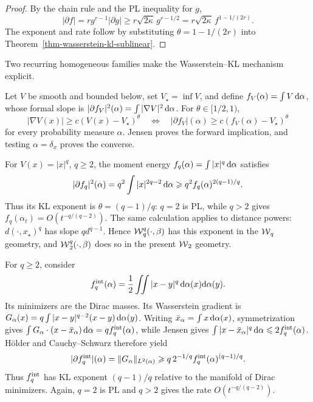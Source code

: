\begin{proof}
	By the chain rule and the PL inequality for \(g\),
	\[
		|\partial f|
		=
		rg^{r-1}|\partial g|
		\geq
		r\sqrt{2\kappa}\,g^{r-1/2}
		=
		r\sqrt{2\kappa}\,f^{1-1/(2r)}.
	\]
	The exponent and rate follow by substituting \(\theta=1-1/(2r)\) into Theorem~\ref{thm-wasserstein-kl-sublinear}.
\end{proof}

Two recurring homogeneous families make the Wasserstein--KL mechanism explicit.

\begin{rem}\label{ex-homogeneous-wasserstein-kl}
	Let \(V\) be smooth and bounded below, set \(V_\star=\inf V\), and define \(f_V(\alpha)=\int V\,\d\alpha\), whose formal slope is \(|\partial f_V|^2(\alpha)=\int|\nabla V|^2\,\d\alpha\). For \(\theta\in[1/2,1)\),
	\[
		|\nabla V(x)|\geq c(V(x)-V_\star)^\theta
		\quad\Longleftrightarrow\quad
		|\partial f_V|(\alpha)\geq c(f_V(\alpha)-V_\star)^\theta
	\]
	for every probability measure \(\alpha\). Jensen proves the forward implication, and testing \(\alpha=\delta_x\) proves the converse.

	For \(V(x)=|x|^q\), \(q\geq2\), the moment energy \(f_q(\alpha)=\int|x|^q\,\d\alpha\) satisfies
	\[
		|\partial f_q|^2(\alpha)
		=q^2\int|x|^{2q-2}\,\d\alpha
		\geq q^2 f_q(\alpha)^{2(q-1)/q}.
	\]
	Thus its KL exponent is \(\theta=(q-1)/q\): \(q=2\) is PL, while \(q>2\) gives \(f_q(\alpha_t)=O(t^{-q/(q-2)})\). The same calculation applies to distance powers: \(d(\cdot,x_\star)^q\) has slope \(q d^{q-1}\). Hence \(\Wass_q^q(\cdot,\beta)\) has this exponent in the \(\Wass_q\) geometry, and \(\Wass_2^q(\cdot,\beta)\) does so in the present \(\Wass_2\) geometry.
\end{rem}

\begin{rem}\label{rem-homogeneous-interaction-kl}
	For \(q\geq2\), consider
	\[
		f_q^{\rm int}(\alpha)
		=
		\frac12\iint |x-y|^q\,\d\alpha(x)\d\alpha(y).
	\]
	Its minimizers are the Dirac masses. Its Wasserstein gradient is \(G_\alpha(x)=q\int|x-y|^{q-2}(x-y)\,\d\alpha(y)\). Writing \(\bar x_\alpha=\int x\,\d\alpha(x)\), symmetrization gives \(\int G_\alpha\cdot(x-\bar x_\alpha)\,\d\alpha=qf_q^{\rm int}(\alpha)\), while Jensen gives \(\int|x-\bar x_\alpha|^q\,\d\alpha\leq2f_q^{\rm int}(\alpha)\). H{\"o}lder and Cauchy--Schwarz therefore yield
	\[
		|\partial f_q^{\rm int}|(\alpha)
		=\|G_\alpha\|_{L^2(\alpha)}
		\geq q\,2^{-1/q}f_q^{\rm int}(\alpha)^{(q-1)/q}.
	\]
	Thus \(f_q^{\rm int}\) has KL exponent \((q-1)/q\) relative to the manifold of Dirac minimizers. Again, \(q=2\) is PL and \(q>2\) gives the rate \(O(t^{-q/(q-2)})\).
\end{rem}

